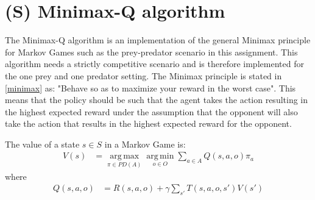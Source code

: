 \section{(S) Minimax-Q algorithm}
The Minimax-Q algorithm is an implementation of the general Minimax principle for Markov Games such as the prey-predator scenario in this assignment. This algorithm needs a strictly competitive scenario and is therefore implemented for the one prey and one predator setting. The Minimax principle is stated in \ref{minimax} as: "Behave so as to maximize your reward in the worst case". This means that the policy should be such that the agent takes the action resulting in the highest expected reward under the assumption that the opponent will also take the action that results in the highest expected reward for the opponent.  

The value of a state $s\in S$ in a Markov Game is:
\begin{align}
V(s) &= \operatorname*{arg\,max}_{\pi \in PD(A)}
\operatorname*{arg\,min}_{o \in O}
\sum_{a \in A} Q(s,a,o) \pi_a
\end{align}
where
\begin{align}
Q(s,a,o) &= R(s,a,o) + \gamma \sum_{s'} T(s,a,o,s')V(s')
\end{align}
